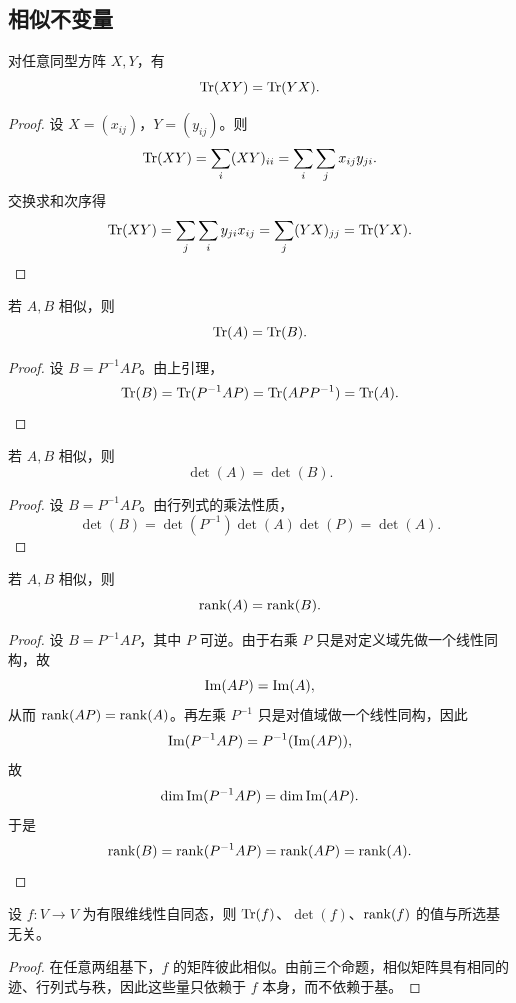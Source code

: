 \subsection{相似不变量}

\begin{lemma}
对任意同型方阵 $X,Y$，有
\[
  \mathrm{Tr}(XY)=\mathrm{Tr}(YX).
\]
\end{lemma}

\begin{proof}
设 $X=(x_{ij})$，$Y=(y_{ij})$。则
\[
  \mathrm{Tr}(XY)=\sum_i (XY)_{ii}=\sum_i\sum_j x_{ij}y_{ji}.
\]
交换求和次序得
\[
  \mathrm{Tr}(XY)=\sum_j\sum_i y_{ji}x_{ij}=\sum_j (YX)_{jj}=\mathrm{Tr}(YX).
\]
\end{proof}

\begin{proposition}
若 $A,B$ 相似，则
\[
  \mathrm{Tr}(A)=\mathrm{Tr}(B).
\]
\end{proposition}

\begin{proof}
设 $B=P^{-1}AP$。由上引理，
\[
  \mathrm{Tr}(B)=\mathrm{Tr}(P^{-1}AP)=\mathrm{Tr}(APP^{-1})=\mathrm{Tr}(A).
\]
\end{proof}

\begin{proposition}
若 $A,B$ 相似，则
\[
  \det(A)=\det(B).
\]
\end{proposition}

\begin{proof}
设 $B=P^{-1}AP$。由行列式的乘法性质，
\[
  \det(B)=\det(P^{-1})\det(A)\det(P)=\det(A).
\]
\end{proof}

\begin{proposition}
若 $A,B$ 相似，则
\[
  \operatorname{rank}(A)=\operatorname{rank}(B).
\]
\end{proposition}

\begin{proof}
设 $B=P^{-1}AP$，其中 $P$ 可逆。由于右乘 $P$ 只是对定义域先做一个线性同构，故
\[
  \mathrm{Im}(AP)=\mathrm{Im}(A),
\]
从而 $\operatorname{rank}(AP)=\operatorname{rank}(A)$。再左乘 $P^{-1}$ 只是对值域做一个线性同构，因此
\[
  \mathrm{Im}(P^{-1}AP)=P^{-1}(\mathrm{Im}(AP)),
\]
故
\[
  \dim\mathrm{Im}(P^{-1}AP)=\dim\mathrm{Im}(AP).
\]
于是
\[
  \operatorname{rank}(B)=\operatorname{rank}(P^{-1}AP)=\operatorname{rank}(AP)=\operatorname{rank}(A).
\]
\end{proof}

\begin{corollary}
设 $f\colon V\to V$ 为有限维线性自同态，则 $\mathrm{Tr}(f)$、$\det(f)$、$\operatorname{rank}(f)$ 的值与所选基无关。
\end{corollary}

\begin{proof}
在任意两组基下，$f$ 的矩阵彼此相似。由前三个命题，相似矩阵具有相同的迹、行列式与秩，因此这些量只依赖于 $f$ 本身，而不依赖于基。
\end{proof}

